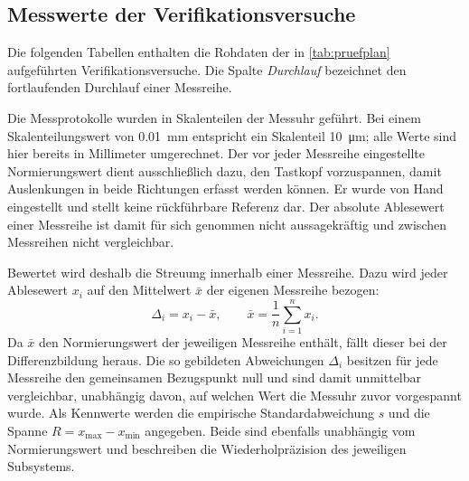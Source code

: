 \subsection{Messwerte der Verifikationsversuche}\label{sec:AnhangMesswerte}
Die folgenden Tabellen enthalten die Rohdaten der in \cref{tab:pruefplan} aufgeführten
Verifikationsversuche. Die Spalte \emph{Durchlauf} bezeichnet den fortlaufenden Durchlauf
einer Messreihe.

Die Messprotokolle wurden in Skalenteilen der Messuhr geführt. Bei einem
Skalenteilungswert von \qty{0.01}{\milli\meter} entspricht ein Skalenteil
\qty{10}{\micro\meter}; alle Werte sind hier bereits in Millimeter umgerechnet.
Der vor jeder Messreihe eingestellte Normierungswert dient ausschließlich dazu, den
Tastkopf vorzuspannen, damit Auslenkungen in beide
Richtungen erfasst werden können. Er wurde von Hand eingestellt und stellt keine
rückführbare Referenz dar. Der absolute Ablesewert einer Messreihe ist damit für sich
genommen nicht aussagekräftig und zwischen Messreihen nicht vergleichbar.

Bewertet wird deshalb die Streuung innerhalb einer Messreihe. Dazu wird jeder
Ablesewert $x_i$ auf den Mittelwert $\bar{x}$ der eigenen Messreihe bezogen:
%
\begin{equation}
  \Delta_i = x_i - \bar{x},
  \qquad
  \bar{x} = \frac{1}{n}\sum_{i=1}^{n} x_i .
  \label{eq:abweichung}
\end{equation}
%
Da $\bar{x}$ den Normierungswert der jeweiligen Messreihe enthält, fällt dieser bei
der Differenzbildung heraus. Die so gebildeten Abweichungen $\Delta_i$ besitzen für
jede Messreihe den gemeinsamen Bezugspunkt null und sind damit unmittelbar
vergleichbar, unabhängig davon, auf welchen Wert die Messuhr zuvor vorgespannt wurde.
Als Kennwerte werden die empirische Standardabweichung $s$ und die Spanne
$R = x_{\max} - x_{\min}$ angegeben. Beide sind ebenfalls unabhängig vom
Normierungswert und beschreiben die Wiederholpräzision des jeweiligen Subsystems.


